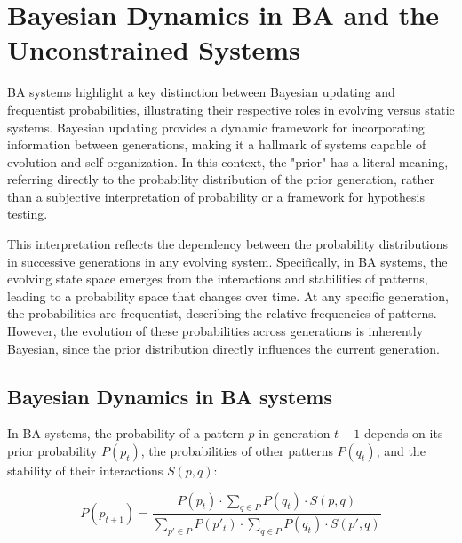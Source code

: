 \documentclass[entropy,article,submit,pdftex,oneauthor]{Definitions/mdpi}
\begin{document}
\section{Bayesian Dynamics in BA and the Unconstrained Systems}

BA systems highlight a key distinction between Bayesian \cite{mcgrayne2011theory} updating and frequentist probabilities, illustrating their respective roles in evolving versus static systems. Bayesian updating provides a dynamic framework for incorporating information between generations, making it a hallmark of systems capable of evolution and self-organization. In this context, the "prior" has a literal meaning, referring directly to the probability distribution of the prior generation, rather than a subjective interpretation of probability or a framework for hypothesis testing.

This interpretation reflects the dependency between the probability distributions in successive generations in any evolving system. Specifically, in BA systems, the evolving state space emerges from the interactions and stabilities of patterns, leading to a probability space that changes over time. At any specific generation, the probabilities are frequentist, describing the relative frequencies of patterns. However, the evolution of these probabilities across generations is inherently Bayesian, since the prior distribution directly influences the current generation.

\subsection{Bayesian Dynamics in BA systems}

In BA systems, the probability of a pattern \( p \) in generation \( t+1 \) depends on its prior probability \( P(p_t) \), the probabilities of other patterns \( P(q_t) \), and the stability of their interactions \( S(p, q) \):

\begin{equation}
P(p_{t+1}) = \frac{P(p_t) \cdot \sum_{q \in P} P(q_t) \cdot S(p, q)}{\sum_{p' \in P} P(p'_t) \cdot \sum_{q \in P} P(q_t) \cdot S(p', q)}
\label{eq:bayes}
\end{equation}
\end{document}
